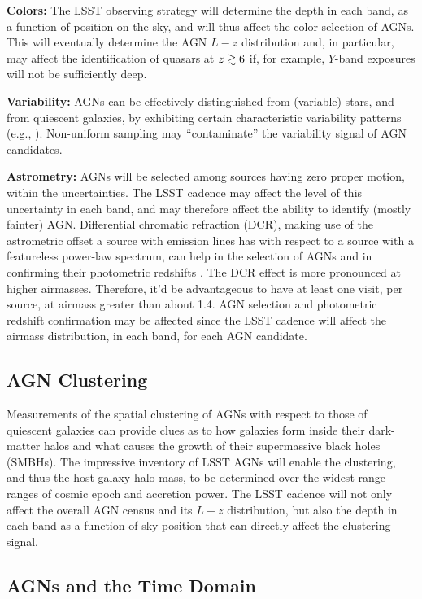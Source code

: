 {\bf Colors:} The LSST observing strategy will determine the depth in each band, as a function of position on the sky, and will thus affect the color selection of AGNs. This will eventually determine the AGN $L-z$ distribution and, in particular, may affect the identification of quasars at $z\gtrsim 6$ if, for example, $Y$-band exposures will not be sufficiently deep.

{\bf Variability:} AGNs can be effectively distinguished from (variable) stars, and from quiescent galaxies, by exhibiting certain characteristic variability patterns (e.g., \citet{ButlerandBloom2011}). Non-uniform sampling may ``contaminate'' the variability signal of AGN candidates.

{\bf Astrometry:} AGNs will be selected among sources having zero
proper motion, within the uncertainties. The LSST cadence may affect
the level of this uncertainty in each band, and may therefore affect
the ability to identify (mostly fainter) AGN.
%
Differential chromatic refraction (DCR), making use of the astrometric
offset a source with emission lines has with respect to a source with
a featureless power-law spectrum, can help in the selection of AGNs
and in confirming their photometric redshifts
\citep{KaczmarczikEtal2009}. The DCR effect is more pronounced at
higher airmasses. Therefore, it'd be advantageous to have at least one
visit, per source, at airmass greater than about 1.4. AGN selection
and photometric redshift confirmation may be affected since the LSST
cadence will affect the airmass distribution, in each band, for each
AGN candidate.

\subsection{AGN Clustering}
\label{sec:\secname:clustering}

\noindent Measurements of the spatial clustering of AGNs with respect
to those of quiescent galaxies can provide clues as to how galaxies
form inside their dark-matter halos and what causes the growth of
their supermassive black holes (SMBHs). The impressive inventory of
LSST AGNs will enable the clustering, and thus the host galaxy halo
mass, to be determined over the widest range ranges of cosmic epoch
and accretion power.
%
The LSST cadence will not only affect the overall AGN census and its
$L-z$ distribution, but also the depth in each band as a function of
sky position that can directly affect the clustering signal.

\subsection{AGNs and the Time Domain}
\label{sec:\secname:time}

